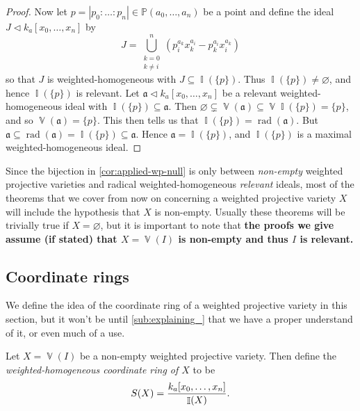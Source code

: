 \documentclass[10pt,notitlepage]{article}
\numberwithin{equation}{subsection}
\DeclareMathOperator{\van}{\mathbb{V}}
\DeclareMathOperator{\ide}{\mathbb{I}}
\DeclareMathOperator{\rad}{rad}
\newcommand{\pee}{\mathbb{P}}
\newcommand{\kazn}{k_a[x_0,\ldots,x_n]}
\newcommand{\pazn}{\pee(a_0,\ldots,a_n)}
\begin{document}
\begin{proof}
        Now let $p=|p_0:\ldots:p_n|\in\pazn$ be a point and define the ideal $J \triangleleft \kazn$ by
        \[
            J = \bigcup_{\substack{k=0\\k\neq i}}^n \left(p_i^{a_k}x_k^{a_i}-p_k^{a_i}x_i^{a_k}\right)
        \]
        so that $J$ is weighted-homogeneous with $J\subseteq\ide(\{p\})$.
        Thus $\ide(\{p\})\neq\varnothing$, and hence $\ide(\{p\})$ is relevant.
        Let $\mathfrak{a}\triangleleft\kazn$ be a relevant weighted-homogeneous ideal with $\ide(\{p\})\subseteq\mathfrak{a}$.
        Then $\varnothing\subsetneq\van(\mathfrak{a})\subseteq\van\ide(\{p\})=\{p\}$, and so $\van(\mathfrak{a})=\{p\}$.
        This then tells us that $\ide(\{p\})=\rad(\mathfrak{a})$.
        But $\mathfrak{a}\subseteq\rad(\mathfrak{a})=\ide(\{p\})\subseteq\mathfrak{a}$.
        Hence $\mathfrak{a}=\ide(\{p\})$, and $\ide(\{p\})$ is a maximal weighted-homogeneous ideal.
    \end{proof}

    \begin{note}
        Since the bijection in \cref{cor:applied-wp-null} is only between \emph{non-empty} weighted projective varieties and radical weighted-homogeneous \emph{relevant} ideals, most of the theorems that we cover from now on concerning a weighted projective variety $X$ will include the hypothesis that $X$ is non-empty.
        Usually these theorems will be trivially true if $X=\varnothing$, but it is important to note that \textbf{the proofs we give assume (if stated) that $X=\van(I)$ is non-empty and thus $I$ is relevant.}
    \end{note}




    \subsection{Coordinate rings} %
    \label{sub:coordinate_rings}

    We define the idea of the coordinate ring of a weighted projective variety in this section, but it won't be until \cref{sub:explaining_} that we have a proper understand of it, or even much of a use.

    \begin{definition}
        Let $X=\van(I)$ be a non-empty weighted projective variety.
        Then define the \emph{weighted-homogeneous coordinate ring of $X$} to be
        \[
            S(X) = \frac{\kazn}{\ide(X)}.\qedhere
        \]
    \end{definition}
\end{document}
